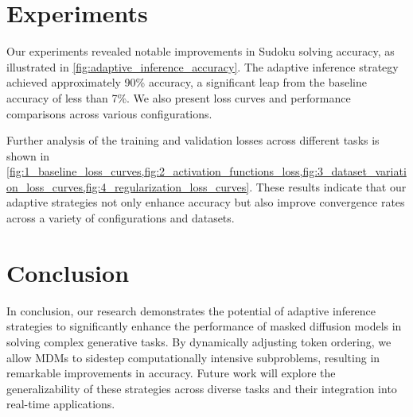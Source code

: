 \documentclass{article} %
\begin{document}
\section{Experiments}
Our experiments revealed notable improvements in Sudoku solving accuracy, as illustrated in \cref{fig:adaptive_inference_accuracy}. The adaptive inference strategy achieved approximately 90\% accuracy, a significant leap from the baseline accuracy of less than 7\%. We also present loss curves and performance comparisons across various configurations.


Further analysis of the training and validation losses across different tasks is shown in \cref{fig:1_baseline_loss_curves,fig:2_activation_functions_loss,fig:3_dataset_variation_loss_curves,fig:4_regularization_loss_curves}. These results indicate that our adaptive strategies not only enhance accuracy but also improve convergence rates across a variety of configurations and datasets.



\section{Conclusion}
In conclusion, our research demonstrates the potential of adaptive inference strategies to significantly enhance the performance of masked diffusion models in solving complex generative tasks. By dynamically adjusting token ordering, we allow MDMs to sidestep computationally intensive subproblems, resulting in remarkable improvements in accuracy. Future work will explore the generalizability of these strategies across diverse tasks and their integration into real-time applications.





\end{document}
